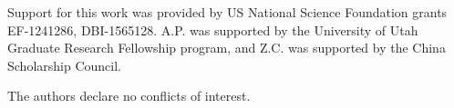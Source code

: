 \documentclass[draft, linenumbers]{agujournal2018}
\begin{document}
Support for this work was provided by US National Science Foundation grants EF-1241286, DBI-1565128. A.P. was supported by the University of Utah Graduate Research Fellowship program, and Z.C. was supported by the China Scholarship Council.

The authors declare no conflicts of interest.
 
 
\end{document}
